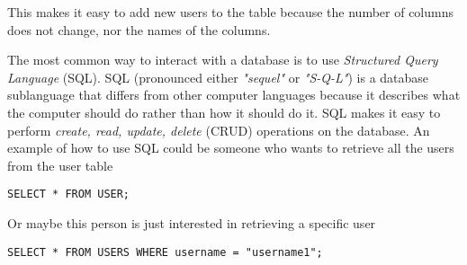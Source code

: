 This makes it easy to add new users to the table because the number of columns does not change, nor the names of the columns.

The most common way to interact with a database is to use \textit{Structured Query Language} (SQL). SQL (pronounced either \textit{"sequel"} or \textit{"S-Q-L"}) is a database sublanguage that differs from other computer languages because it describes what the computer should do rather than how it should do it. %
SQL makes it easy to perform \textit{create, read, update, delete} (CRUD) operations on the database. %
 An example of how to use SQL could be someone who wants to retrieve all the users from the user table

\begin{lstlisting}
SELECT * FROM USER;
\end{lstlisting}

Or maybe this person is just interested in retrieving a specific user

\begin{lstlisting}
SELECT * FROM USERS WHERE username = "username1";
\end{lstlisting}


